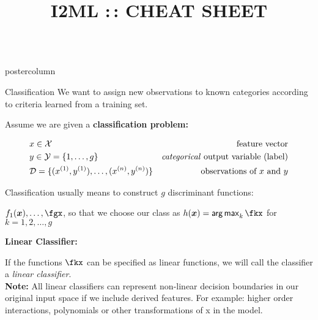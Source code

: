 \documentclass{beamer}
\title{I2ML :\,: CHEAT SHEET} %
\newlength{\columnheight} %
\begin{document}
\begin{frame}[fragile]{}
\begin{columns}
	\begin{column}{.31\textwidth}
		\begin{beamercolorbox}[center]{postercolumn}
			\begin{minipage}{.98\textwidth}
				\parbox[t][\columnheight]{\textwidth}{				
					\begin{myblock}{Classification}
						We want to assign new observations to known categories according to criteria learned from a training set.  
						\vspace*{1ex}
						\begin{codebox}
						    Assume we are given a \textbf{classification problem:}
						\end{codebox}
						\begin{eqnarray*} & x \in \mathcal{X} \quad & \text{feature vector}\\ & y \in \mathcal{Y} = \{1, \ldots, g\} \quad & \text{\emph{categorical} output variable (label)}\\ &\mathcal{D} = \{ (x^{(1)}, y^{(1)}), \ldots, (x^{(n)}, y^{(n)})\} & \text{observations of $x$ and $y$} \end{eqnarray*}
						
						\vspace*{1ex}
						
						\begin{codebox}
							Classification usually means to construct $g$ discriminant functions:
						\end{codebox}
						\hspace*{1ex}$f_1(\xv), \ldots, \fgx$, so that we choose our class as $h(\xv) = \argmax_k \fkx$ \hspace*{1ex}for $k = 1, 2,\ldots, g$
						
						\vspace*{1ex}
						
						\begin{codebox}
							\textbf{Linear Classifier:}
						\end{codebox}
						\hspace*{1ex}If the functions $\fkx$ can be specified as linear functions, we will call \hspace*{1ex}the classifier a \emph{linear classifier}.\\
						
						\hspace*{1ex}\textbf{Note: }All linear classifiers can represent non-linear decision boundaries \hspace*{1ex}in our original input space if we include derived features. For example: \hspace*{1ex}higher order interactions, polynomials or other transformations of x in \hspace*{1ex}the model.
			

\end{myblock}}
\end{minipage}
\end{beamercolorbox}
\end{column}
\end{columns}
\end{frame}
\end{document}
